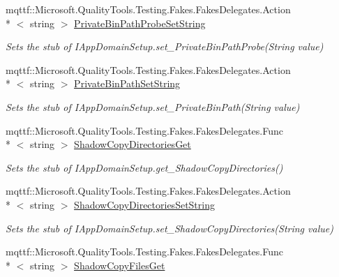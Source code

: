 \begin{DoxyCompactItemize}
mqttf\-::\-Microsoft.\-Quality\-Tools.\-Testing.\-Fakes.\-Fakes\-Delegates.\-Action\\*
$<$ string $>$ \hyperlink{class_system_1_1_fakes_1_1_stub_i_app_domain_setup_a922ae4f287e106f23f9394e636953884}{Private\-Bin\-Path\-Probe\-Set\-String}
\begin{DoxyCompactList}\small\item\em Sets the stub of I\-App\-Domain\-Setup.\-set\-\_\-\-Private\-Bin\-Path\-Probe(\-String value)\end{DoxyCompactList}\item 
mqttf\-::\-Microsoft.\-Quality\-Tools.\-Testing.\-Fakes.\-Fakes\-Delegates.\-Action\\*
$<$ string $>$ \hyperlink{class_system_1_1_fakes_1_1_stub_i_app_domain_setup_a036e4f3a660bbc42a43c6c77caa73008}{Private\-Bin\-Path\-Set\-String}
\begin{DoxyCompactList}\small\item\em Sets the stub of I\-App\-Domain\-Setup.\-set\-\_\-\-Private\-Bin\-Path(\-String value)\end{DoxyCompactList}\item 
mqttf\-::\-Microsoft.\-Quality\-Tools.\-Testing.\-Fakes.\-Fakes\-Delegates.\-Func\\*
$<$ string $>$ \hyperlink{class_system_1_1_fakes_1_1_stub_i_app_domain_setup_a07b0ae7860ed18e4aa3e48d8dec08e29}{Shadow\-Copy\-Directories\-Get}
\begin{DoxyCompactList}\small\item\em Sets the stub of I\-App\-Domain\-Setup.\-get\-\_\-\-Shadow\-Copy\-Directories()\end{DoxyCompactList}\item 
mqttf\-::\-Microsoft.\-Quality\-Tools.\-Testing.\-Fakes.\-Fakes\-Delegates.\-Action\\*
$<$ string $>$ \hyperlink{class_system_1_1_fakes_1_1_stub_i_app_domain_setup_a4e84fad0a904a5ee396596f4b45a23d7}{Shadow\-Copy\-Directories\-Set\-String}
\begin{DoxyCompactList}\small\item\em Sets the stub of I\-App\-Domain\-Setup.\-set\-\_\-\-Shadow\-Copy\-Directories(\-String value)\end{DoxyCompactList}\item 
mqttf\-::\-Microsoft.\-Quality\-Tools.\-Testing.\-Fakes.\-Fakes\-Delegates.\-Func\\*
$<$ string $>$ \hyperlink{class_system_1_1_fakes_1_1_stub_i_app_domain_setup_a46431d7497bf0f200cb915529ae71908}{Shadow\-Copy\-Files\-Get}

\end{DoxyCompactItemize}
